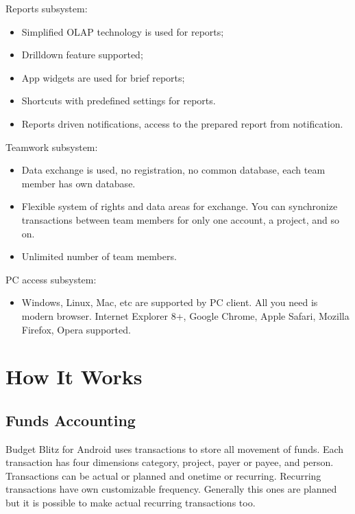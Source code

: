 \documentclass[a4paper,10pt,english]{sphinxmanual}
\begin{document}
Reports subsystem:
\begin{itemize}
\item {} 
Simplified OLAP technology is used for reports;

\item {} 
Drilldown feature supported;

\item {} 
App widgets are used for brief reports;

\item {} 
Shortcuts with predefined settings for reports.

\item {} 
Reports driven notifications, access to the prepared report from notification.

\end{itemize}

Teamwork subsystem:
\begin{itemize}
\item {} 
Data exchange is used, no registration, no common database, each team member has own database.

\item {} 
Flexible system of rights and data areas for exchange. You can synchronize transactions between team members for only one account, a project, and so on.

\item {} 
Unlimited number of team members.

\end{itemize}

PC access subsystem:
\begin{itemize}
\item {} 
Windows, Linux, Mac, etc are supported by PC client. All you need is modern browser. Internet Explorer 8+, Google Chrome, Apple Safari, Mozilla Firefox, Opera supported.

\end{itemize}


\chapter{How It Works}
\label{\detokenize{intro:how-it-works}}\label{\detokenize{intro::doc}}

\section{Funds Accounting}
\label{\detokenize{intro:funds-accounting}}
Budget Blitz for Android uses transactions to store all movement of funds. Each transaction has
four dimensions category, project, payer or payee, and person. Transactions can be
actual or planned and onetime or recurring. Recurring transactions have own customizable frequency. Generally
this ones are planned but it is possible to make actual recurring transactions too.
\end{document}
